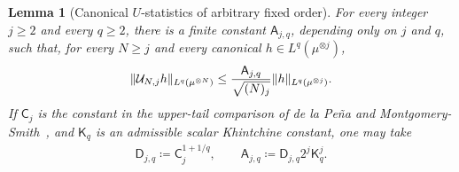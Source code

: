 \documentclass[11pt,reqno]{amsart}
\numberwithin{equation}{section}
\theoremstyle{plain}
\newtheorem{lemma}[lemma]{Lemma}
\theoremstyle{remark}
\DeclarePairedDelimiter{\norm}{\lVert}{\rVert}
\begin{document}
\begin{lemma}[Canonical \(U\)-statistics of arbitrary fixed order]
\label{lem:fixed-order-canonical-U-moment}
For every integer \(j\ge2\) and every \(q\ge2\), there is a finite constant \(\mathsf A_{j,q}\), depending only on \(j\) and \(q\), such that, for every \(N\ge j\) and every canonical \(h\in L^q(\mu^{\otimes j})\),
\begin{align}\label{eq:canonical-U-moment}
 \norm{\mathcal U_{N,j}h}_{L^q(\mu^{\otimes N})}
 \le \frac{\mathsf A_{j,q}}{\sqrt{(N)_j}}
 \norm{h}_{L^q(\mu^{\otimes j})}.
\end{align}
If \(\mathsf C_j\) is the constant in the upper-tail comparison of de la Pe\~na and Montgomery-Smith~\cite[Theorem~1]{dPmS1995}, and \(\mathsf K_q\) is an admissible scalar Khintchine constant, one may take
\begin{align}\label{eq:canonical-U-moment-constants}
 \mathsf D_{j,q}\coloneqq \mathsf C_j^{1+1/q},
 \qquad
 \mathsf A_{j,q}\coloneqq \mathsf D_{j,q}2^j\mathsf K_q^j.
\end{align}
\end{lemma}
\end{document}
